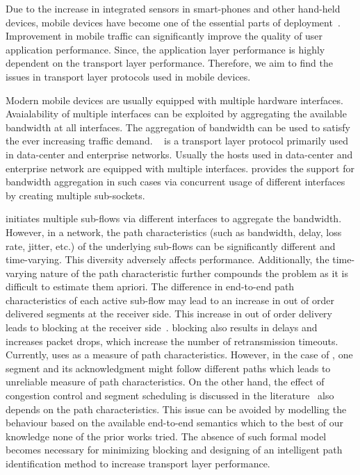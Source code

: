 Due to the increase in integrated sensors in smart-phones and other hand-held devices, mobile devices have become one of the essential parts of  deployment~\cite{el2017smartphone}. Improvement in mobile traffic can significantly improve the quality of  user application performance. Since, the application layer performance is highly dependent on the transport layer performance. Therefore, we aim to find the issues in transport layer protocols used in mobile devices.

Modern mobile devices are usually equipped with multiple hardware interfaces. Avaialability of multiple interfaces can be exploited by aggregating the available bandwidth at all interfaces. The aggregation of bandwidth can be used to satisfy the ever increasing traffic demand. ~\cite{Nikravesh:2016:IUM:2973750.2973769,doi:10.1080/1206212X.2018.1455020,Han:2015:AMW:2716281.2836090,Deng:2014:WLB:2663716.2663727,Mohan2019IsTG} is a transport layer protocol primarily used in data-center and enterprise networks. Usually the hosts used in data-center and enterprise network are equipped with multiple interfaces.  provides the support for bandwidth aggregation in such cases via concurrent usage of different interfaces by creating multiple sub-sockets. 

 initiates multiple sub-flows via different interfaces to aggregate the bandwidth. However, in a network, the path characteristics (such as bandwidth, delay, loss rate, jitter,
etc.) of the underlying sub-flows can be significantly different and time-varying. This diversity adversely affects  performance. Additionally, the time-varying nature of the path characteristic further compounds the problem as it is difficult to estimate them apriori. The difference in end-to-end path characteristics of each active sub-flow may lead to an increase in out of order delivered segments at the receiver side. This increase in out of order delivery leads to  blocking at the receiver side~\cite{cao2016receiver}.  blocking also results in delays and increases packet drops, which increase the number of retransmission timeouts. Currently,  uses  as a measure of path characteristics. However, in the case of , one segment and its acknowledgment might follow different paths which leads to unreliable measure of path characteristics. On the other hand, the effect of  congestion control and segment scheduling is discussed in the literature~\cite{peng2016multipath,khalili2013mptcp,oh2015constraint,kheirkhah2016mmptcp} also depends on the path characteristics. This issue can be avoided by modelling the  behaviour based on the available end-to-end semantics which to the best of our knowledge none of the prior works tried. The absence of such formal model becomes necessary for minimizing  blocking and designing of an intelligent path identification method to increase transport layer performance.


